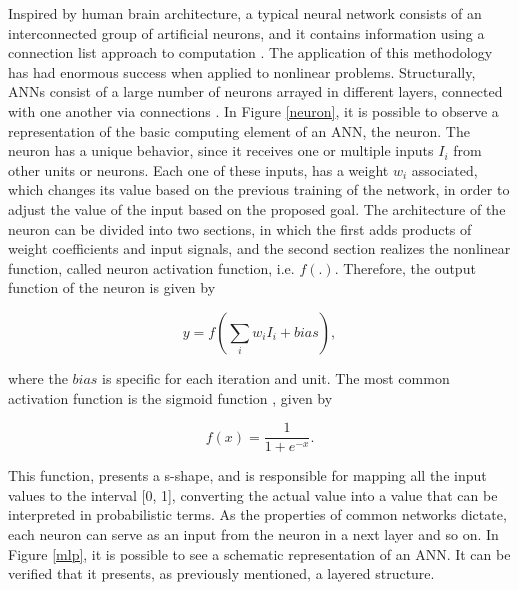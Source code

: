 Inspired by human brain architecture, a typical neural network consists of an interconnected group of artificial neurons, and it contains information using a connection list approach to computation \cite{ann1}. The application of this methodology has had enormous success when applied to nonlinear problems. Structurally, \ac{ANNs} consist of a large number of neurons arrayed in different layers, connected with one another via connections \cite{review2017}. In Figure \ref{neuron}, it is possible to observe a representation of the basic computing element of an \acs{ANN}, the neuron. 
The neuron has a unique behavior, since it receives one or multiple inputs $I_i$ from other units or neurons. Each one of these inputs, has a weight $w_i$ associated, which changes its value based on the previous training of the network, in order to adjust the value of the input based on the proposed goal. The architecture of the neuron can be divided into two sections, in which the first adds products of weight coefficients and input signals, and the second section realizes the nonlinear function, called neuron activation function, i.e. $f(.)$. Therefore, the output function of the neuron is given by \cite{ann1}

\begin{equation}
   y = f(\sum_i w_i I_i + bias), 
   \label{tauequation}
\end{equation}

where the $bias$ is specific for each iteration and unit. The most common activation function is the sigmoid function \cite{ann1}, given by

\begin{equation}
   f(x) = \frac{1}{1+e^{-x}}.
   \label{fequation}
\end{equation}

This function, presents a s-shape, and is responsible for mapping all the input values to the interval [0, 1], converting the actual value into a value that can be interpreted in probabilistic terms. As the properties of common networks dictate, each neuron can serve as an input from the neuron in a next layer and so on. In Figure \ref{mlp}, it is possible to see a schematic representation of an \acs{ANN}. It can be verified that it presents, as previously mentioned, a layered structure. 

